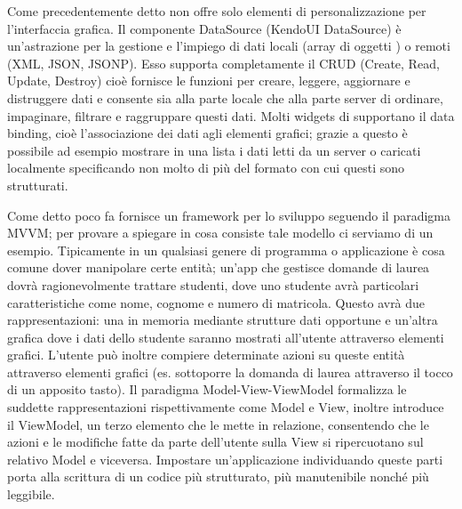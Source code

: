             Come precedentemente detto \kendomob{} non offre solo elementi
            di personalizzazione per l'interfaccia grafica. Il componente
            \mbox{DataSource} (KendoUI \mbox{DataSource}) è un'astrazione per la gestione e
            l'impiego di dati locali (array di oggetti \js{}) o remoti
            (XML, JSON, JSONP). Esso supporta completamente il CRUD (Create,
            Read, Update, Destroy) cioè fornisce le funzioni per creare,
            leggere, aggiornare e distruggere dati e consente sia alla parte
            locale che alla parte server di ordinare, impaginare, filtrare e
            raggruppare questi dati. Molti widgets di \kendomob{} supportano
            il data binding, cioè l'associazione dei dati agli elementi grafici;
            grazie a questo è possibile ad esempio mostrare in una lista i dati
            letti da un server o caricati localmente specificando non molto di
            più del formato con cui questi sono strutturati.

            Come detto poco fa \kendomob{} fornisce un frame\-work per lo
            sviluppo seguendo il paradigma MVVM; per provare a spiegare in cosa
            consiste tale modello ci serviamo di un esempio. Tipicamente in un
            qualsiasi genere di programma o applicazione è cosa comune dover
            manipolare certe entità; un'app che gestisce domande di laurea dovrà
            ragionevolmente trattare studenti, dove uno studente avrà
            particolari caratteristiche come nome, cognome e numero di matricola.
            Questo avrà due rappresentazioni: una in memoria mediante strutture
            dati opportune e un'altra grafica dove i dati dello studente saranno
            mostrati all'utente attraverso elementi grafici. L'utente può
            inoltre compiere determinate azioni su queste entità attraverso
            elementi grafici (es. sottoporre la domanda di laurea attraverso
            il tocco di un apposito tasto). Il paradigma Mo\-del-\-View-\-View\-Mo\-del
            formalizza le suddette rappresentazioni rispettivamente come Model e
            View, inoltre introduce il ViewModel, un terzo elemento che le mette
            in relazione, consentendo che le azioni e le modifiche fatte da
            parte dell'utente sulla View si ripercuotano sul relativo Model e
            viceversa. Impostare un'applicazione individuando queste parti
            porta alla scrittura di un codice più strutturato, più manutenibile
            nonché più leggibile.

